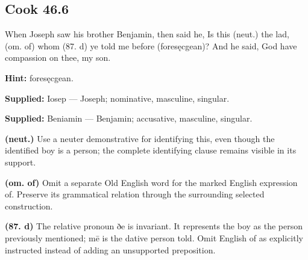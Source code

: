 \par\begin{minipage}{\linewidth}\raggedright
\subsection*{Cook 46.6}

When Joseph saw his brother Benjamin, then said he, Is this (neut.) the lad, (om. of) whom (87. d) ye told me before (foresęcgean)? And he said, God have compassion on thee, my son.

\textbf{Hint:} foresęcgean.

\textbf{Supplied:} Iosep — Joseph; nominative, masculine, singular.

\end{minipage}\par\addvspace{4pt}

\textbf{Supplied:} Beniamin — Benjamin; accusative, masculine, singular.

\textbf{(neut.)} Use a neuter demonstrative for identifying this, even though the identified boy is a person; the complete identifying clause remains visible in its support.

\textbf{(om. of)} Omit a separate Old English word for the marked English expression of. Preserve its grammatical relation through the surrounding selected construction.

\textbf{(87. d)} The relative pronoun ðe is invariant. It represents the boy as the person previously mentioned; mē is the dative person told. Omit English of as explicitly instructed instead of adding an unsupported preposition.

